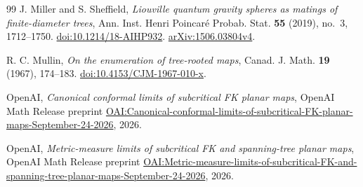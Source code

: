 \begin{thebibliography}{99}
J. Miller and S. Sheffield,
\emph{Liouville quantum gravity spheres as matings of finite-diameter trees},
Ann. Inst. Henri Poincar\'e Probab. Stat. \textbf{55} (2019), no.~3,
1712--1750.
\href{https://doi.org/10.1214/18-AIHP932}{doi:10.1214/18-AIHP932}.
\href{https://arxiv.org/abs/1506.03804v4}{arXiv:1506.03804v4}.

R. C. Mullin,
\emph{On the enumeration of tree-rooted maps},
Canad. J. Math. \textbf{19} (1967), 174--183.
\href{https://doi.org/10.4153/CJM-1967-010-x}{doi:10.4153/CJM-1967-010-x}.

OpenAI,
\emph{Canonical conformal limits of subcritical FK planar maps},
OpenAI Math Release preprint
\href{https://github.com/openai/math/blob/main/preprints/Canonical-conformal-limits-of-subcritical-FK-planar-maps-September-24-2026/main.pdf}{OAI:Canonical-conformal-limits-of-subcritical-FK-planar-maps-September-24-2026},
2026.

OpenAI,
\emph{Metric-measure limits of subcritical FK and spanning-tree planar maps},
OpenAI Math Release preprint
\href{https://github.com/openai/math/blob/main/preprints/Metric-measure-limits-of-subcritical-FK-and-spanning-tree-planar-maps-September-24-2026/main.pdf}{OAI:Metric-measure-limits-of-subcritical-FK-and-spanning-tree-planar-maps-September-24-2026},
2026.

\end{thebibliography}
